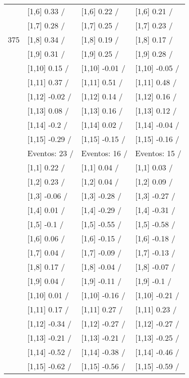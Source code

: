 \begin{table}
\begin{tabular}[t]{llll}
 & {}[1,6] 0.33  / & {}[1,6] 0.22  / & {}[1,6] 0.21  /\\
 & {}[1,7] 0.28  / & {}[1,7] 0.25  / & {}[1,7] 0.23  /\\
375 & {}[1,8] 0.34  / & {}[1,8] 0.19  / & {}[1,8] 0.17  /\\
\addlinespace
 & {}[1,9] 0.31  / & {}[1,9] 0.25  / & {}[1,9] 0.28  /\\
 & {}[1,10] 0.15  / & {}[1,10] -0.01  / & {}[1,10] -0.05  /\\
 & {}[1,11] 0.37  / & {}[1,11] 0.51  / & {}[1,11] 0.48  /\\
 & {}[1,12] -0.02  / & {}[1,12] 0.14  / & {}[1,12] 0.16  /\\
 & {}[1,13] 0.08  / & {}[1,13] 0.16  / & {}[1,13] 0.12  /\\
\addlinespace
 & {}[1,14] -0.2  / & {}[1,14] 0.02  / & {}[1,14] -0.04  /\\
 & {}[1,15] -0.29  / & {}[1,15] -0.15  / & {}[1,15] -0.16  /\\
 & Eventos:  23 / & Eventos:  16 / & Eventos:  15 /\\
 & {}[1,1] 0.22  / & {}[1,1] 0.04  / & {}[1,1] 0.03  /\\
 & {}[1,2] 0.23  / & {}[1,2] 0.04  / & {}[1,2] 0.09  /\\
\addlinespace
 & {}[1,3] -0.06  / & {}[1,3] -0.28  / & {}[1,3] -0.27  /\\
 & {}[1,4] 0.01  / & {}[1,4] -0.29  / & {}[1,4] -0.31  /\\
 & {}[1,5] -0.1  / & {}[1,5] -0.55  / & {}[1,5] -0.58  /\\
 & {}[1,6] 0.06  / & {}[1,6] -0.15  / & {}[1,6] -0.18  /\\
 & {}[1,7] 0.04  / & {}[1,7] -0.09  / & {}[1,7] -0.13  /\\
\addlinespace
500 & {}[1,8] 0.17  / & {}[1,8] -0.04  / & {}[1,8] -0.07  /\\
 & {}[1,9] 0.04  / & {}[1,9] -0.11  / & {}[1,9] -0.1  /\\
 & {}[1,10] 0.01  / & {}[1,10] -0.16  / & {}[1,10] -0.21  /\\
 & {}[1,11] 0.17  / & {}[1,11] 0.27  / & {}[1,11] 0.23  /\\
 & {}[1,12] -0.34  / & {}[1,12] -0.27  / & {}[1,12] -0.27  /\\
\addlinespace
 & {}[1,13] -0.21  / & {}[1,13] -0.21  / & {}[1,13] -0.25  /\\
 & {}[1,14] -0.52  / & {}[1,14] -0.38  / & {}[1,14] -0.46  /\\
 & {}[1,15] -0.62  / & {}[1,15] -0.56  / & {}[1,15] -0.59  /\\
\bottomrule
\end{tabular}
\end{table}
